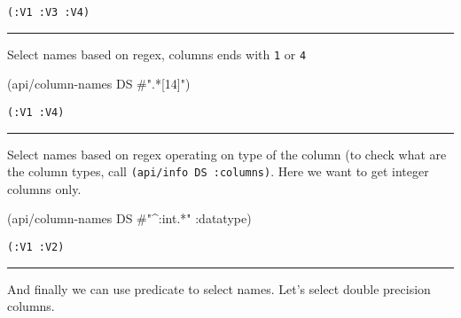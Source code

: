 \documentclass[]{article}
\newenvironment{Shaded}{\begin{snugshade}}{\end{snugshade}}
\newcommand{\KeywordTok}[1]{\textcolor[rgb]{0.13,0.29,0.53}{\textbf{#1}}}
\newcommand{\SpecialStringTok}[1]{\textcolor[rgb]{0.31,0.60,0.02}{#1}}
\newcommand{\VariableTok}[1]{\textcolor[rgb]{0.00,0.00,0.00}{#1}}
\newcommand{\AttributeTok}[1]{\textcolor[rgb]{0.77,0.63,0.00}{#1}}
\newcommand{\NormalTok}[1]{#1}
\begin{document}
\begin{verbatim}
(:V1 :V3 :V4)
\end{verbatim}

\begin{center}\rule{0.5\linewidth}{0.5pt}\end{center}

Select names based on regex, columns ends with \texttt{1} or \texttt{4}

\begin{Shaded}
\begin{Highlighting}[]
\NormalTok{(api/column-names DS }\SpecialStringTok{#".*[14]"}\NormalTok{)}
\end{Highlighting}
\end{Shaded}

\begin{verbatim}
(:V1 :V4)
\end{verbatim}

\begin{center}\rule{0.5\linewidth}{0.5pt}\end{center}

Select names based on regex operating on type of the column (to check
what are the column types, call \texttt{(api/info\ DS\ :columns)}. Here
we want to get integer columns only.

\begin{Shaded}
\begin{Highlighting}[]
\NormalTok{(api/column-names DS }\SpecialStringTok{#"^:int.*"} \AttributeTok{:datatype}\NormalTok{)}
\end{Highlighting}
\end{Shaded}

\begin{verbatim}
(:V1 :V2)
\end{verbatim}

\begin{center}\rule{0.5\linewidth}{0.5pt}\end{center}

And finally we can use predicate to select names. Let's select double
precision columns.

\begin{Shaded}
\end{Shaded}
\end{document}
